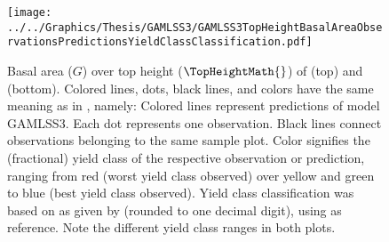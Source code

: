 \begin{figure}[h]
  \centering
  \texttt{[image: ../../Graphics/Thesis/GAMLSS3/GAMLSS3TopHeightBasalAreaObservationsPredictionsYieldClassClassification.pdf]}
  \caption{Basal area (\(G\)) over top height (\(\TopHeightMath{}\)) of \Beech{} (top) and \Spruce{} (bottom).  Colored lines, dots, black lines, and colors have the same meaning as in , namely:  Colored lines represent predictions of model GAMLSS3.  Each dot represents one observation.  Black lines connect observations belonging to the same sample plot.  Color signifies the (fractional) yield class of the respective observation or prediction, ranging from red (worst yield class observed) over yellow and green to blue (best yield class observed).  Yield class classification was based on \ProductivityIndexText{} as given by  (rounded to one decimal digit), using  as reference.  Note the different yield class ranges in both plots.}
  \label{fig:GAMLSS3TopHeightBasalAreaObservationsPredictionsYieldClassClassification}
\end{figure}

\clearpage{}

